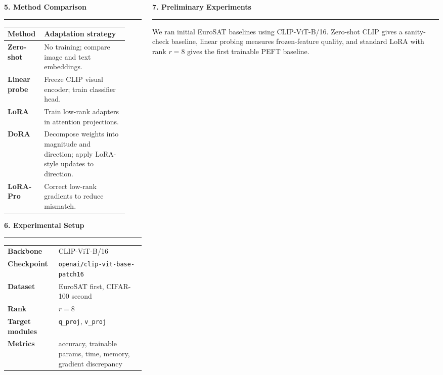 \documentclass[final]{beamer}
\newcommand{\code}[1]{\texttt{#1}}
\newcommand{\sectiontitle}[1]{%
  \vspace{0.45em}%
  {\Large\bfseries\color{titleblue}#1}\par
  \vspace{0.10em}%
  {\color{rulegray}\rule{\linewidth}{0.9pt}}\par
  \vspace{0.22em}%
}
\begin{document}
\begin{frame}[t]
\begin{columns}[t,totalwidth=\textwidth]
\begin{column}{0.315\textwidth}
\sectiontitle{5. Method Comparison}
\begin{center}
\begin{tabular}{>{\bfseries}p{0.22\linewidth}p{0.66\linewidth}}
\toprule
Method & Adaptation strategy \\
\midrule
Zero-shot & No training; compare image and text embeddings. \\
Linear probe & Freeze CLIP visual encoder; train classifier head. \\
LoRA & Train low-rank adapters in attention projections. \\
DoRA & Decompose weights into magnitude and direction; apply LoRA-style updates to direction. \\
LoRA-Pro & Correct low-rank gradients to reduce mismatch. \\
\bottomrule
\end{tabular}
\end{center}

\sectiontitle{6. Experimental Setup}
\begin{center}
\begin{tabular}{>{\bfseries}ll}
\toprule
Backbone & CLIP-ViT-B/16 \\
Checkpoint & \code{openai/clip-vit-base-patch16} \\
Dataset & EuroSAT first, CIFAR-100 second \\
Rank & $r=8$ \\
Target modules & \code{q\_proj}, \code{v\_proj} \\
Metrics & accuracy, trainable params, time, memory, gradient discrepancy \\
\bottomrule
\end{tabular}
\end{center}

\end{column}

\begin{column}{0.315\textwidth}
\color{textgray}

\sectiontitle{7. Preliminary Experiments}
We ran initial EuroSAT baselines using CLIP-ViT-B/16. Zero-shot CLIP gives a
sanity-check baseline, linear probing measures frozen-feature quality, and
standard LoRA with rank $r=8$ gives the first trainable PEFT baseline.


\end{column}
\end{columns}
\end{frame}
\end{document}
